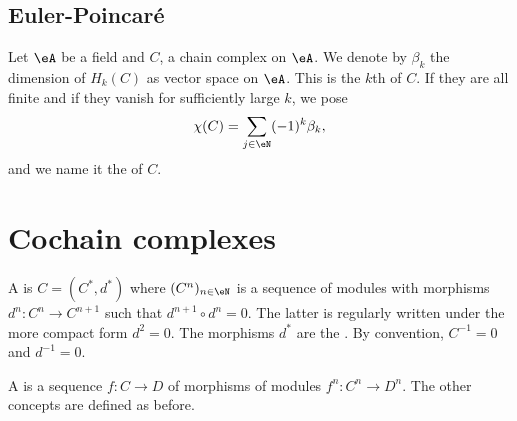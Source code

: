 					\subsection{Euler-Poincaré}

Let $\eA$ be a field and $C$, a chain complex on $\eA$. We denote by $\beta_k$ the dimension of $H_k(C)$ as vector space on $\eA$. This is the $k$th  of $C$. If they are all finite and if they vanish for sufficiently large $k$, we pose
\begin{equation}
	\chi(C)=\sum_{j\in \eN}(-1)^k\beta_k,
\end{equation}
and we name it the  of $C$.

					\section{Cochain complexes}

A  is $C=(C^*,d^*)$ where $(C^n)_{n\in \eN}$ is a sequence of modules with morphisms $d^n\colon C^n\to C^{n+1}$ such that $d^{n+1}\circ d^n=0$. The latter is regularly written under the more compact form $d^2=0$. The morphisms $d^*$ are the . By convention, $C^{-1}=0$ and $d^{-1}=0$.

A  is a sequence $f\colon C\to D$ of morphisms of modules $f^n\colon C^n\to D^n$. The other concepts are defined as before.

